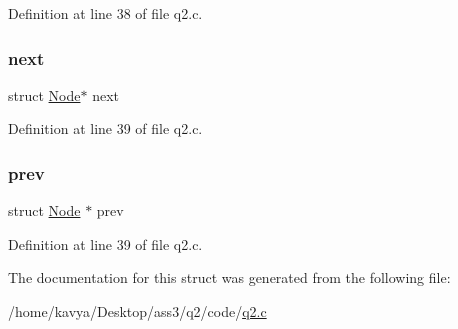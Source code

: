Definition at line 38 of file q2.\+c.

\mbox{\label{struct_node_aa162dd1e0693188a22b1f13b9a2a0ef0}} 
\subsubsection{\texorpdfstring{next}{next}}
{\footnotesize\ttfamily struct \hyperlink{struct_node}{Node}$\ast$ next}



Definition at line 39 of file q2.\+c.

\mbox{\label{struct_node_ab61af691843e7459182834757ed63fe0}} 
\subsubsection{\texorpdfstring{prev}{prev}}
{\footnotesize\ttfamily struct \hyperlink{struct_node}{Node} $\ast$ prev}



Definition at line 39 of file q2.\+c.



The documentation for this struct was generated from the following file\+:\begin{DoxyCompactItemize}
\item 
/home/kavya/\+Desktop/ass3/q2/code/\hyperlink{q2_8c}{q2.\+c}\end{DoxyCompactItemize}
